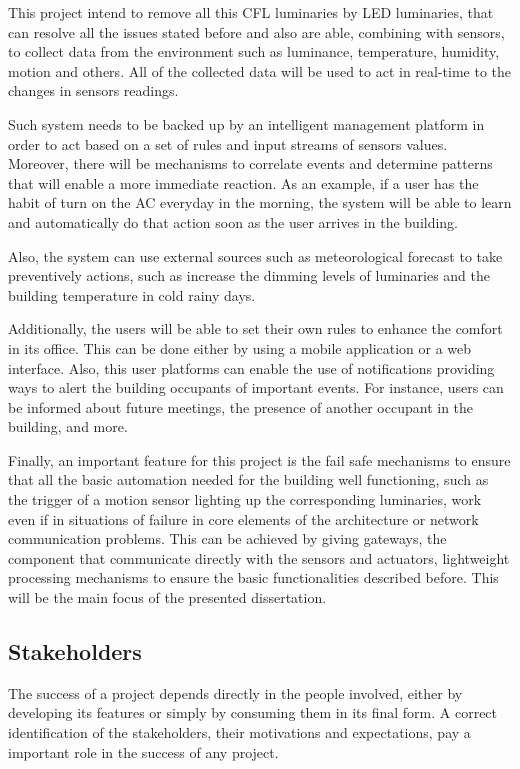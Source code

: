 This project intend to remove all this CFL luminaries by LED luminaries, that can resolve all the issues stated before and also are able, combining with sensors, to collect data from the environment such as luminance, temperature, humidity, motion and others. All of the collected data will be used to act in real-time to the changes in sensors readings. 

Such system needs to be backed up by an intelligent management platform in order to act based on a set of rules and input streams of sensors values. Moreover, there will be mechanisms to correlate events and determine patterns that will enable a more immediate reaction. As an example, if a user has the habit of turn on the AC everyday in the morning, the system will be able to learn and automatically do that action soon as the user arrives in the building. 

Also, the system can use external sources such as meteorological forecast to take preventively actions, such as increase the dimming levels of luminaries and the building temperature in cold rainy days.

Additionally, the users will be able to set their own rules to enhance the comfort in its office. This can be done either by using a mobile application or a web interface. Also, this user platforms can enable the use of notifications providing ways to alert the building occupants of important events. For instance, users can be informed about future meetings, the presence of another occupant in the building, and more.

Finally, an important feature for this project is the fail safe mechanisms to ensure that all the basic automation needed for the building well functioning, such as the trigger of a motion sensor lighting up the corresponding luminaries, work even if in situations of failure in core elements of the architecture or network communication problems. This can be achieved by giving gateways, the component that communicate directly with the sensors and actuators, lightweight processing mechanisms to ensure the basic functionalities described before. This will be the main focus of the presented dissertation.


\subsection{Stakeholders}
\label{Architecture:Stakeholders}

The success of a project depends directly in the people involved, either by developing its features or simply by consuming them in its final form. A correct identification of the stakeholders, their motivations and expectations, pay a important role in the success of any project. 

